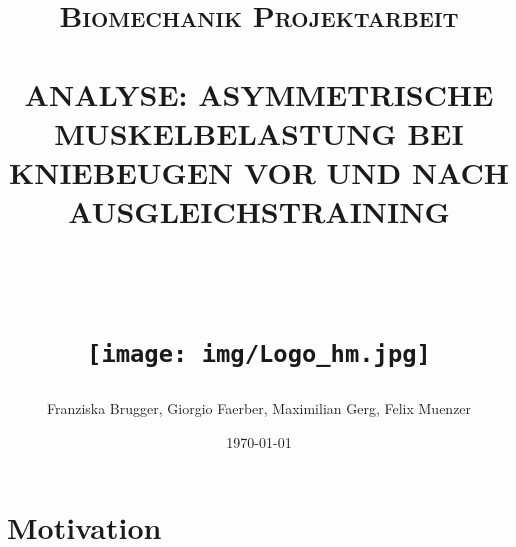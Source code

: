 

\fancyfoot[C]{\thepage}
\setlength {\marginparwidth }{2cm}


\begin{titlepage}
   \title{ \normalsize \textsc{Biomechanik Projektarbeit}
         \\ [1.0cm]
         \HRule{0.1pt} \\
         \LARGE \textbf{
             \uppercase{Analyse: asymmetrische  Muskelbelastung bei Kniebeugen vor und nach Ausgleichstraining\\}\\
         }
         \HRule{2pt} \\ [0.5cm]
         \begin{figure*}[h!]
               \centering
               \texttt{[image: img/Logo\_hm.jpg]}
           \end{figure*}
           }

   \date{\today}

   \author{
           Franziska Brugger,
           Giorgio Faerber,
           Maximilian Gerg,
           Felix Muenzer
           }


   \end{titlepage}
   \maketitle
   \tableofcontents %
   \newpage
   \setcounter{page}{1}
   \listoffigures
   \listoftables
   \newpage


   \section{Motivation}
   


